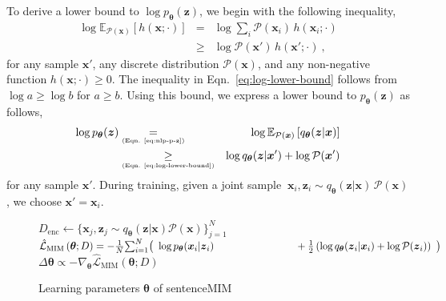\documentclass{article}
\newcommand{\bs}{\boldsymbol}
\newcommand{\x}{{\bs{x}}}
\newcommand{\z}{{\bs z}}
\newcommand{\params}{{\bs \theta}}
\newcommand{\pjoint}{\mathcal{P}}
\newcommand{\pdec}{p}
\newcommand{\penc}{q}
\newcommand{\Mdec}{\pdec_{\params}}
\newcommand{\Menc}{\penc_{\params}}
\newcommand{\EMIMloss}{\hat{\mathcal{L}}_\text{MIM}}
\newcommand{\E}[2]{\mathbb{E}_{#1}\left[#2\right]}
\newcommand{\Penc}{\Menc(\z | \x)\, \pjoint(\x)}
\begin{document}
To derive a lower bound to $\log \Mdec(\z)$, we begin with the following inequality,
\begin{eqnarray}
\!\!\log \E{\pjoint(\x)}{h(\x;\cdot)}  \!\!
&=& \!\!  \log \sum_{i} \pjoint(\x_i)\, h(\x_i;\cdot) \nonumber  \\
&\ge& \!\log \pjoint(\x')\, h(\x';\cdot) ~,
\label{eq:log-lower-bound}
\end{eqnarray}
for any sample $\x'$, any discrete distribution $\pjoint(\x)$, and any non-negative function $h(\x;\cdot) \ge 0$.
The inequality in Eqn.\ \eqref{eq:log-lower-bound} follows from $\log a \ge \log b$ for $a \ge b$.
Using this bound, we express a lower bound to $\Mdec(\z)$ as follows,
\begin{eqnarray}
    \log \Mdec(\z) &\underset{\text{\tiny (Eqn. \ref{eq:nlp-p-z})}}{=}& \log \E{\pjoint(\x)}{\Menc(\z|\x)} \nonumber \\
    &\underset{\text{\tiny (Eqn. \ref{eq:log-lower-bound})}}{\ge}& \log \Menc(\z|\x')  + \log \pjoint(\x') \label{eq:nlp-p-z-lower-bound}
\end{eqnarray}
for any sample $\x'$. During training, given a joint sample $~\x_i, \z_i \sim \Penc$, we choose $\x' = \x_i$.

\begin{figure}[t]
\vspace*{-0.35cm}
\centering
\begin{minipage}[t]{0.95\columnwidth}
\begin{algorithm}[H]
    \caption{Learning parameters $\params$ of sentenceMIM}
    \label{algo:sentencemim}
    \begin{algorithmic}[1]
        \STATE $D_\mathrm{enc} \gets \{ \x_j, \z_j \sim \Menc(\z|\x)\pjoint(\x) \}_{j=1}^{N}$
        \STATE $\EMIMloss \left( \params ; D \right) = -\frac{1}{N}\! \sum_{i=1}^{N}\! \big( ~ \log \Mdec(\x_i | \z_i) ~~~~~~
        \linebreak ~~~~~~~~~~~~~~~~~~  + \frac{1}{2} \left( \log \Menc(\z_i | \x_i) + \log \pjoint(\z_i) \right) ~ \big)$
        \STATE $\Delta \params \propto -\nabla_{\params}  \EMIMloss \left( \params ; D \right)$
        \ENDWHILE
    \end{algorithmic}
\end{algorithm}
\end{minipage}
\vspace*{-0.5cm}
\end{figure}
\end{document}
